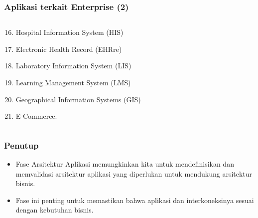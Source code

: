 \documentclass[aspectratio=169, table]{beamer}
\begin{document}
\begin{frame}
	\frametitle{Aplikasi terkait Enterprise (2)}
	\begin{columns}
		\begin{column}{0.5\textwidth}
				\begin{enumerate}
                    \setcounter{enumi}{15}
                    \item Hospital Information System (HIS)
					\item Electronic Health Record (EHRre)
					\item Laboratory Information System (LIS)
					\item Learning Management System (LMS)
					\item Geographical Information Systems (GIS)
					\item E-Commerce.
				\end{enumerate}
		\end{column}
		\begin{column}{0.5\textwidth}
			\begin{center}
				\begin{enumerate}
				\end{enumerate}
			\end{center}
		\end{column}
	\end{columns}
\end{frame}

\begin{frame}
\frametitle{Penutup}
\begin{itemize}
	\item Fase Arsitektur Aplikasi memungkinkan kita untuk mendefinisikan dan memvalidasi arsitektur aplikasi yang diperlukan untuk mendukung arsitektur bisnis.
	\item Fase ini penting untuk memastikan bahwa aplikasi dan interkoneksinya sesuai dengan kebutuhan bisnis.
\end{itemize}
\end{frame}
\end{document}
